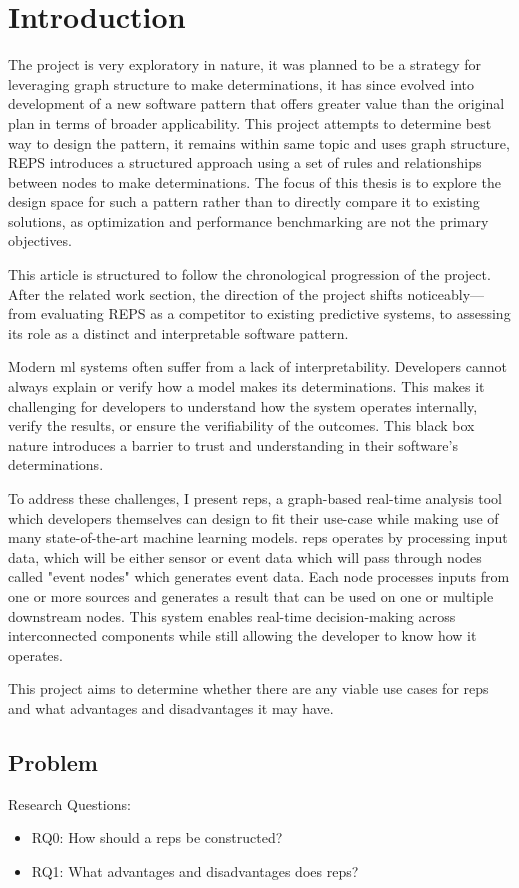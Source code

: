 \section{Introduction}
The project is very exploratory in nature, it was planned to be a strategy for leveraging graph structure to make determinations, it has since evolved into development of a new software pattern that offers greater value than the original plan in terms of broader applicability. This project attempts to determine best way to design the pattern, it remains within same topic and uses graph structure,  REPS introduces a structured approach using a set of rules and relationships between nodes to make determinations. The focus of this thesis is to explore the design space for such a pattern rather than to directly compare it to existing solutions, as optimization and performance benchmarking are not the primary objectives.

This article is structured to follow the chronological progression of the project. After the related work section, the direction of the project shifts noticeably—from evaluating REPS as a competitor to existing predictive systems, to assessing its role as a distinct and interpretable software pattern.
	
Modern \gls{ml} systems often suffer from a lack of interpretability. Developers cannot always explain or verify how a model makes its determinations. This makes it challenging for developers to understand how the system operates internally, verify the results, or ensure the verifiability of the outcomes. This black box nature introduces a barrier to trust and understanding in their software's determinations.

To address these challenges, I present \gls{reps}, a graph-based real-time analysis tool which developers themselves can design to fit their use-case while making use of many state-of-the-art machine learning models. \gls{reps} operates by processing input data, which will be either sensor or event data which will pass through nodes called "event nodes" which generates event data. Each node processes inputs from one or more sources and generates a result that can be used on one or multiple downstream nodes. This system enables real-time decision-making across interconnected components while still allowing the developer to know how it operates.

This project aims to determine whether there are any viable use cases for \gls{reps} and what advantages and disadvantages it may have.
\newpage
\subsection{Problem}\label{sec:RQProblem}
Research Questions:
	\begin{itemize}
		\item RQ0: How should a \gls{reps} be constructed?
		\item RQ1: What advantages and disadvantages does \gls{reps}?
	\end{itemize}
	
